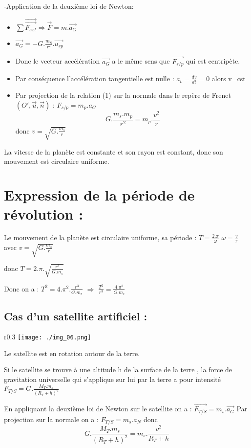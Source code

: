 \documentclass[12pt]{article}
\begin{document}
-Application de la deuxième loi de Newton: 

\begin{itemize}
	\item $\sum{\vec{\vec{F_{ext}}}} \Rightarrow \vec{F}=m.\vec{a_G}$ 
	\item $\vec{a_G} = -G.\frac{m_S}{r^2}.\vec{u_{sp}}$
	\item Donc le vecteur accélération $\vec{a_G}$ a le même sens que $\vec{F_{s/p}}$ qui est centripète.
	\item Par conséquence l'accélération tangentielle est nulle : $a_t = \frac{dv}{dt} = 0$ alors v=cst
	\item Par projection de la relation (1) sur la normale dans le repère de Frenet $(O', \vec{u},\vec{n})$ : $F_{s/p} = m_p.a_G$ $$G.\frac{m_s.m_p}{r^2} = m_p.\frac{v^2}{r}$$ donc $v = \sqrt{G.\frac{m_s}{r}}$
\end{itemize}

La vitesse de la planète est constante et son rayon est constant, donc son mouvement est circulaire uniforme.

\section*{Expression de la période de révolution : }

Le mouvement de la planète est circulaire uniforme, sa période : $T=\frac{2.\pi}{\omega}$ $\omega = \frac{v}{r}$ avec $v = \sqrt{G.\frac{m_s}{r}}$ 

donc  $T = 2.\pi.\sqrt{\frac{r^3}{G.m_s}}$

Donc on a : $T^2 = 4.\pi^2.\frac{r^3}{G.m_s}$ $\Rightarrow$ $\frac{T^2}{r^3} = \frac{4.\pi^2}{G.m_s}$

\subsection{Cas d'un satellite artificiel :}
\begin{wrapfigure}{r}{0.3\textwidth}
	\vspace{-2cm}
	\texttt{[image: ./img\_06.png]}
\end{wrapfigure}
Le satellite est en rotation autour de la terre. 

Si le satellite se trouve à une altitude h de la surface de la terre , la force de gravitation universelle qui s'applique sur lui par la terre a pour intensité $F_{T/S} = G.\frac{M_T.m_s}{(R_T + h)^2}$

En appliquant la deuxième loi de Newton sur le satellite on a : $\vec{F_{T/S}} = m_s.\vec{a_G}$ Par projection sur la normale on a : $F_{T/S} = m_s.a_N$
donc $$G.\frac{M_T.m_s}{(R_T + h)^2} = m_s.\frac{v^2}{R_T + h}$$
\end{document}
